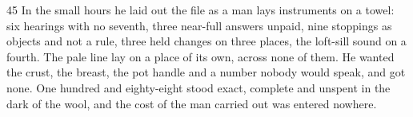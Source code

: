 \begin{CRchronicle}{45}
In the small hours he laid out the file as a man lays instruments on a towel: six hearings with no seventh, three near-full answers unpaid, nine stoppings as objects and not a rule, three held changes on three places, the loft-sill sound on a fourth. The pale line lay on a place of its own, across none of them. He wanted the crust, the breast, the pot handle and a number nobody would speak, and got none. One hundred and eighty-eight stood exact, complete and unspent in the dark of the wool, and the cost of the man carried out was entered nowhere.
\end{CRchronicle}
